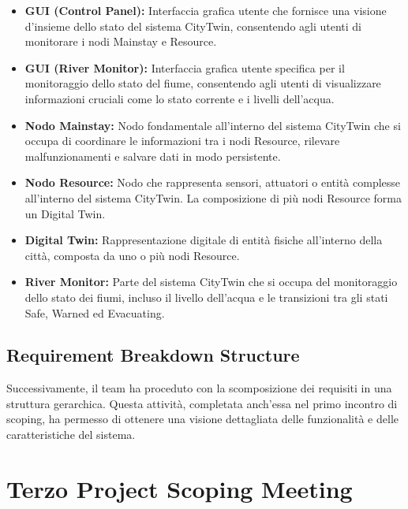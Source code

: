 \begin{itemize}
    \item \textbf{GUI (Control Panel):} Interfaccia grafica utente che fornisce una visione d'insieme dello stato del sistema CityTwin, consentendo agli utenti di monitorare i nodi Mainstay e Resource.
  
    \item \textbf{GUI (River Monitor):} Interfaccia grafica utente specifica per il monitoraggio dello stato del fiume, consentendo agli utenti di visualizzare informazioni cruciali come lo stato corrente e i livelli dell'acqua.
  
    \item \textbf{Nodo Mainstay:} Nodo fondamentale all'interno del sistema CityTwin che si occupa di coordinare le informazioni tra i nodi Resource, rilevare malfunzionamenti e salvare dati in modo persistente.
  
    \item \textbf{Nodo Resource:} Nodo che rappresenta sensori, attuatori o entità complesse all'interno del sistema CityTwin. La composizione di più nodi Resource forma un Digital Twin.
  
    \item \textbf{Digital Twin:} Rappresentazione digitale di entità fisiche all'interno della città, composta da uno o più nodi Resource.
  
    \item \textbf{River Monitor:} Parte del sistema CityTwin che si occupa del monitoraggio dello stato dei fiumi, incluso il livello dell'acqua e le transizioni tra gli stati Safe, Warned ed Evacuating.
  
  \end{itemize}

\subsection{Requirement Breakdown Structure}

Successivamente, il team ha proceduto con la scomposizione dei requisiti in una struttura gerarchica. Questa attività, completata anch'essa nel primo incontro di scoping, ha permesso di ottenere una visione dettagliata delle funzionalità e delle caratteristiche del sistema.

\section{Terzo Project Scoping Meeting}

